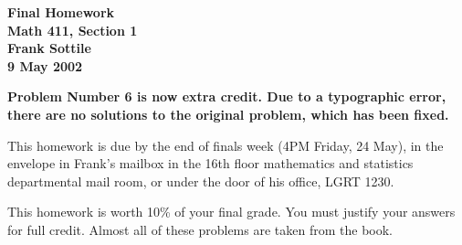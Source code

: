 \documentclass[12pt]{amsart}
\begin{document}
\begin{center}
\Large\bf Final Homework\\
Math 411, Section 1\\
\large Frank Sottile\\
9 May 2002\vspace{10pt}
\end{center}

{\bf Problem Number 6 is now extra credit.  Due to a typographic error, 
     there are no solutions to the original problem, which has been fixed.}

This homework is due by the end of finals week (4PM Friday, 24 May), in the
envelope in Frank's mailbox in the 16th floor mathematics and statistics
departmental mail room, or under the door of
his office, LGRT 1230. 

This homework is worth 10\% of your final grade.
You must justify your answers for full credit.
Almost all of these problems are taken from the book.\bigskip
\end{document}
